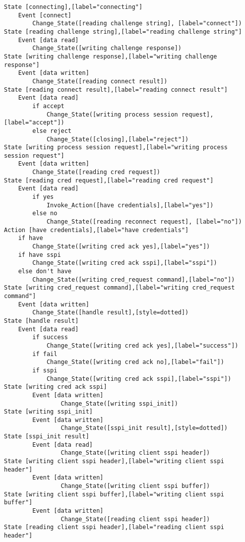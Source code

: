 \begin{comment}
This is the state machine for the smpd connect command.
Graph [smpd connect],
      [size="7.5, 10"]
\end{comment}
\begin{verbatim}
State [connecting],[label="connecting"]
	Event [connect]
		Change_State([reading challenge string], [label="connect"])
State [reading challenge string],[label="reading challenge string"]
	Event [data read]
		Change_State([writing challenge response])
State [writing challenge response],[label="writing challenge response"]
	Event [data written]
		Change_State([reading connect result])
State [reading connect result],[label="reading connect result"]
	Event [data read]
		if accept
			Change_State([writing process session request],[label="accept"])
		else reject
			Change_State([closing],[label="reject"])
State [writing process session request],[label="writing process session request"]
	Event [data written]
		Change_State([reading cred request])
State [reading cred request],[label="reading cred request"]
	Event [data read]
		if yes
			Invoke_Action([have credentials],[label="yes"])
		else no
			Change_State([reading reconnect request], [label="no"])
Action [have credentials],[label="have credentials"]
	if have
		Change_State([writing cred ack yes],[label="yes"])
	if have sspi
		Change_State([writing cred ack sspi],[label="sspi"])
	else don't have
		Change_State([writing cred_request command],[label="no"])
State [writing cred_request command],[label="writing cred_request command"]
	Event [data written]
		Change_State([handle result],[style=dotted])
State [handle result]
	Event [data read]
		if success
			Change_State([writing cred ack yes],[label="success"])
		if fail
			Change_State([writing cred ack no],[label="fail"])
		if sspi
			Change_State([writing cred ack sspi],[label="sspi"])
State [writing cred ack sspi]
        Event [data written]
                Change_State([writing sspi_init])
State [writing sspi_init]
        Event [data written]
                Change_State([sspi_init result],[style=dotted])
State [sspi_init result]
        Event [data read]
                Change_State([writing client sspi header])
State [writing client sspi header],[label="writing client sspi header"]
        Event [data written]
                Change_State([writing client sspi buffer])
State [writing client sspi buffer],[label="writing client sspi buffer"]
        Event [data written]
                Change_State([reading client sspi header])
State [reading client sspi header],[label="reading client sspi header"]

\end{verbatim}
